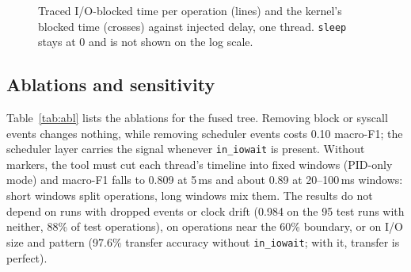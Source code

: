 \documentclass[conference]{IEEEtran}
\begin{document}
\begin{figure}[t]
\centering
{}
\caption{Traced I/O-blocked time per operation (lines) and the kernel's blocked time (crosses) against injected delay, one thread. \texttt{sleep} stays at 0 and is not shown on the log scale.}
\label{fig:delay}
\end{figure}

\subsection{Ablations and sensitivity}
Table~\ref{tab:abl} lists the ablations for the fused tree. Removing block or syscall events changes nothing, while removing scheduler events costs 0.10 macro-F1; the scheduler layer carries the signal whenever \texttt{in\_iowait} is present. Without markers, the tool must cut each thread's timeline into fixed windows (PID-only mode) and macro-F1 falls to 0.809 at 5\,ms and about 0.89 at 20--100\,ms windows: short windows split operations, long windows mix them. The results do not depend on runs with dropped events or clock drift (0.984 on the 95 test runs with neither, 88\% of test operations), on operations near the 60\% boundary, or on I/O size and pattern (97.6\% transfer accuracy without \texttt{in\_iowait}; with it, transfer is perfect).
\end{document}
